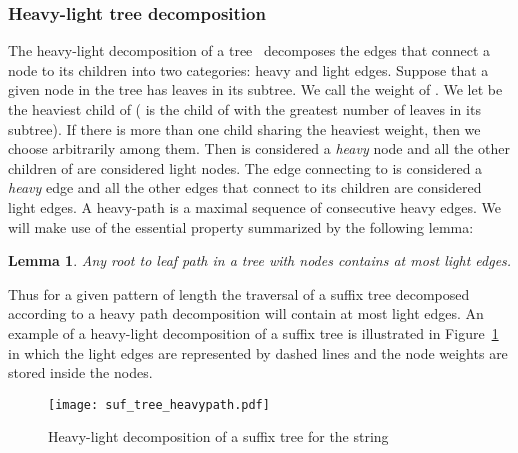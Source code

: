 \documentclass{article}
\newcommand{\?}{\mskip1.5mu}
\newtheorem{lemma}{Lemma}
\newcounter{noqed}
\newcommand{\qed}{ \ifmmode\mbox{
}\fi\rule[-.05em]{.3em}{.7em}\setcounter{noqed}{0}}
\newenvironment{proof}[1][{}]{\noindent{\bf Proof#1.
}\setcounter{noqed}{1}}{\ifnum\value{noqed}=1\qed\fi\par\medskip}
\begin{document}
\subsubsection{Heavy-light tree decomposition}
The heavy-light decomposition of a tree~\cite{HT84} decomposes the edges that connect a node to its children into two categories: heavy and light edges. Suppose that a given node  in the tree has  leaves in its subtree. We call  the weight of . We let  be the heaviest child of  ( is the child of  with the greatest number of leaves in its subtree). If there is more than one child sharing the heaviest weight, then we choose  arbitrarily among them. Then  is considered  a \emph{heavy} node and all the other children of  are considered light nodes. The edge connecting  to  is considered a \emph{heavy} edge and all the other edges that connect  to its children are considered light edges. A heavy-path is a maximal sequence of consecutive heavy edges. We will make use of the essential property summarized by  the following lemma:
\begin{lemma}
Any root to leaf path in a tree with  nodes contains at most  light edges.
\end{lemma}
\begin{comment}
\begin{proof}
Suppose that the path traverses  light edges. First note that if a light edge connects a node  of weight  to its child node  of weight , then necessarily . This can be proved by contradiction. Suppose that . Then the heaviest child of  has weight at least  which means that . So each time we traverse a light edge we divide the size of the subtree (in terms of the number of leaves) by a factor of at least . In order to reach a node of weight  (a leaf) starting from a node of weight  we can traverse at most  light edges as, at each traversal of a light edge, we get to a subtree whose number of leaves is at most half the number of nodes in the parent node subtree. 
\qed
\end{proof}
\end{comment}
Thus for a given pattern of length  the traversal of a suffix tree decomposed according to a heavy path decomposition will contain at most  light edges. An example of a heavy-light decomposition of a suffix tree is illustrated in Figure~\ref{pic:heavy_path_suf_tree} in which the light edges are represented by dashed lines and the node weights are stored inside the nodes. 
\begin{figure}[htb] 
\centering\texttt{[image: suf\_tree\_heavypath.pdf]} 
\caption{Heavy-light decomposition of a suffix tree for the string } \label{pic:heavy_path_suf_tree} \end{figure}
\end{document}
